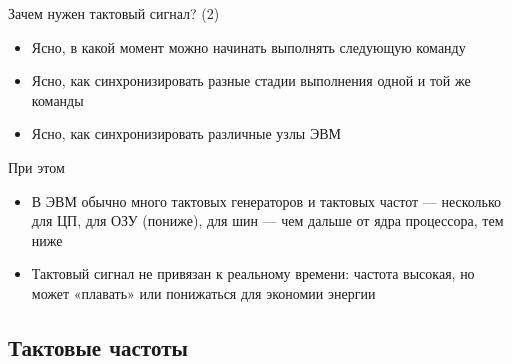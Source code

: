 \documentclass[xetex,aspectratio=43]{beamer}
\begin{document}
\begin{frame}{Зачем нужен тактовый сигнал? (2)}
    \begin{itemize}
        \tightlist
        \item
        Ясно, в какой момент можно начинать выполнять следующую команду
        \item
        Ясно, как синхронизировать разные стадии выполнения одной и той же
        команды
        \item
        Ясно, как синхронизировать различные узлы ЭВМ
    \end{itemize}

    При этом

    \begin{itemize}
        \tightlist
        \item
        В ЭВМ обычно много тактовых генераторов и тактовых частот ---
        несколько для ЦП, для ОЗУ (пониже), для шин --- чем дальше
        от ядра процессора, тем ниже
        \item
        Тактовый сигнал не привязан к реальному времени: частота высокая, но
        может «плавать» или понижаться для экономии энергии
    \end{itemize}
\end{frame}

\subsection{Тактовые частоты}
\end{document}
